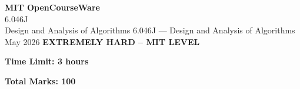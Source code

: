 \documentclass[12pt,a4paper]{exam}
\begin{document}
\begin{center}
{\LARGE \textbf{MIT OpenCourseWare}}\\6.046J\\Design and Analysis of Algorithms
\vspace{0.5cm}
{6.046J} --- {Design and Analysis of Algorithms}
\vspace{0.3cm}
May 2026
\vspace{0.3cm}
\textbf{EXTREMELY HARD -- MIT LEVEL}
\end{center}

\begin{center}
\textbf{Time Limit: 3 hours}
\end{center}

\begin{center}
\textbf{Total Marks: 100}
\end{center}

\vspace{0.5cm}
\end{document}
